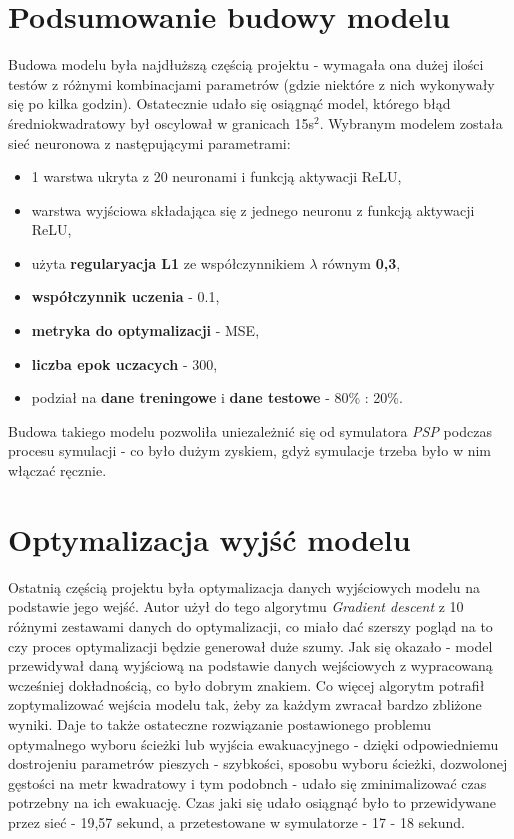 \documentclass[12pt]{aghdpl}
\begin{document}
		\section{Podsumowanie budowy modelu}
		Budowa modelu była najdłuższą częścią projektu - wymagała ona dużej ilości testów z różnymi kombinacjami parametrów (gdzie niektóre z nich wykonywały się po kilka godzin). Ostatecznie udało się osiągnąć model, którego błąd średniokwadratowy był oscylował w granicach 15s$^2$. Wybranym modelem została sieć neuronowa z następującymi parametrami:
		\begin{itemize}
		\item 1 warstwa ukryta z 20 neuronami i funkcją aktywacji ReLU,
		\item warstwa wyjściowa składająca się z jednego neuronu z funkcją aktywacji ReLU,
		\item użyta \textbf{regularyacja L1} ze współczynnikiem $\lambda$ równym \textbf{0,3},
		\item \textbf{współczynnik uczenia} - 0.1,
		\item \textbf{metryka do optymalizacji} - MSE,
		\item \textbf{liczba epok uczacych} - 300,
		\item podział na \textbf{dane treningowe} i \textbf{dane testowe} - 80\% : 20\%.
		\end{itemize}
		
		Budowa takiego modelu pozwoliła uniezależnić się od symulatora \textit{PSP} podczas procesu symulacji - co było dużym zyskiem, gdyż symulacje trzeba było w nim włączać ręcznie.
		
		\section{Optymalizacja wyjść modelu}
		Ostatnią częścią projektu była optymalizacja danych wyjściowych modelu na podstawie jego wejść. Autor użył do tego algorytmu \textit{Gradient descent} z 10 różnymi zestawami danych do optymalizacji, co miało dać szerszy pogląd na to czy proces optymalizacji będzie generował duże szumy. Jak się okazało - model przewidywał daną wyjściową na podstawie danych wejściowych z wypracowaną wcześniej dokładnością, co było dobrym znakiem. Co więcej algorytm potrafił zoptymalizować wejścia modelu tak, żeby za każdym zwracał bardzo zbliżone wyniki. Daje to także ostateczne rozwiązanie postawionego problemu optymalnego wyboru ścieżki lub wyjścia ewakuacyjnego - dzięki odpowiedniemu dostrojeniu parametrów pieszych - szybkości, sposobu wyboru ścieżki, dozwolonej gęstości na metr kwadratowy i tym podobnch - udało się zminimalizować czas potrzebny na ich ewakuację. Czas jaki się udało osiągnąć było to przewidywane przez sieć - 19,57 sekund, a przetestowane w symulatorze - 17 - 18 sekund.
		
	\printbibliography
\end{document}
